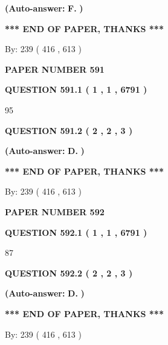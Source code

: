 \documentclass{ctexart}
\begin{document}
 
{\textbf{(Auto-answer:}}
{\textbf{\large{
F.}}}
{\textbf{)}}
 
 
   
   
   
   
\vspace{1.0in} 
{\textbf{\large{ *** END OF PAPER, THANKS *** }}} 
   
   
\hspace{1.0in} By: 
 239 ( 416 ,  613 )
   
   
   
   
\newpage 
\setcounter{page}{ 
   591001 } 
   
   
 {\textbf{ \Large{ PAPER NUMBER  591  }}}
   
   
   
   
  
  
{\textbf{\large{QUESTION
591.1 
 ( 1 , 1 , 6791 )
}}}

95
  
  
{\textbf{\large{QUESTION
591.2 
 ( 2 , 2 , 3 )
}}}
 
 
{\textbf{(Auto-answer:}}
{\textbf{\large{
D.}}}
{\textbf{)}}
 
 
   
   
   
   
\vspace{1.0in} 
{\textbf{\large{ *** END OF PAPER, THANKS *** }}} 
   
   
\hspace{1.0in} By: 
 239 ( 416 ,  613 )
   
   
   
   
\newpage 
\setcounter{page}{ 
   592001 } 
   
   
 {\textbf{ \Large{ PAPER NUMBER  592  }}}
   
   
   
   
  
  
{\textbf{\large{QUESTION
592.1 
 ( 1 , 1 , 6791 )
}}}

87
  
  
{\textbf{\large{QUESTION
592.2 
 ( 2 , 2 , 3 )
}}}
 
 
{\textbf{(Auto-answer:}}
{\textbf{\large{
D.}}}
{\textbf{)}}
 
 
   
   
   
   
\vspace{1.0in} 
{\textbf{\large{ *** END OF PAPER, THANKS *** }}} 
   
   
\hspace{1.0in} By: 
 239 ( 416 ,  613 )
   
   
   
\end{document}
